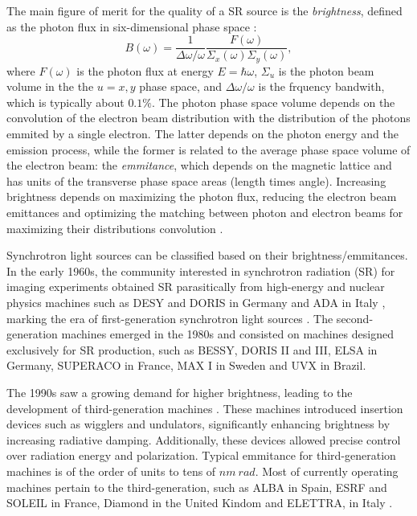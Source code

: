 The main figure of merit for the quality of a SR source is the \textit{brightness}\cite{huang_brightness_2013}, defined as the photon flux in six-dimensional phase space \cite{hettel_challenges_2014}:
\begin{equation}
    B(\omega) = \frac{1}{\Delta \omega/\omega}\frac{F(\omega)}{\Sigma_{x}(\omega)\Sigma_{y}(\omega)},
\end{equation}
where $F(\omega)$ is the photon flux at energy $E=\hbar\omega$, $\Sigma_{u}$ is the photon beam volume in the the $u=x,y$ phase space, and $\Delta\omega/\omega$ is the frquency bandwith, which is typically about $0.1\%$. The photon phase space volume depends on the convolution of the electron beam distribution with the distribution of the photons emmited by a single electron. The latter depends on the photon energy and the emission process, while the former is related to the average phase space volume of the electron beam: the \textit{emmitance}, which depends on the magnetic lattice and has units of the transverse phase space areas (length times angle). Increasing brightness depends on maximizing the photon flux, reducing the electron beam emittances and optimizing the matching between photon and electron beams for maximizing their distributions convolution \cite{wiedemann_particle_2015}.

Synchrotron light sources can be classified based on their brightness/emmitances. In the early 1960s, the community interested in synchrotron radiation (SR) for imaging experiments obtained SR parasitically from high-energy and nuclear physics machines such as DESY and DORIS in Germany and ADA in Italy \cite{simoulin_synchrotron_2016}, marking the era of first-generation synchrotron light sources \cite{liu_towards_2017}. The second-generation machines emerged in the 1980s and consisted on machines designed exclusively for SR production, such as BESSY, DORIS II and III, ELSA in Germany, SUPERACO in France, MAX I in Sweden \cite{simoulin_synchrotron_2016} and UVX in Brazil.

The 1990s saw a growing demand for higher brightness, leading to the development of third-generation machines \cite{liu_towards_2017}. These machines introduced insertion devices such as wigglers and undulators, significantly enhancing brightness by increasing radiative damping. Additionally, these devices allowed precise control over radiation energy and polarization. Typical emmitance for third-generation machines is of the order of units to tens of $\unit{nm}~\unit{rad}$. Most of currently operating machines pertain to the third-generation, such as ALBA in Spain, ESRF and SOLEIL in France, Diamond in the United Kindom and ELETTRA, in Italy \cite{simoulin_synchrotron_2016}.

